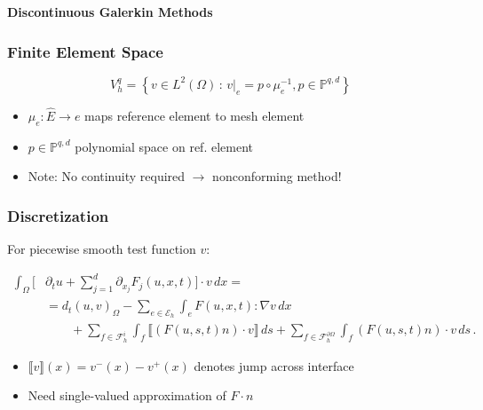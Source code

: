 \documentclass[ignorenonframetext,11pt]{beamer}
\theoremstyle{definition}
\begin{document}

\begin{frame}
\begin{center}
\Large\textbf{Discontinuous Galerkin Methods}
\end{center}
\end{frame}

\begin{frame}
\frametitle{Finite Element Space}

\begin{equation*}
V_h^q = \left\{ v\in L^2(\Omega) \,:\,
v|_e = p\circ\mu_e^{-1}, p\in\mathbb{P}^{q,d}\right\}
\end{equation*}

\begin{itemize}
  \item $\mu_e : \hat{E} \to e$ maps reference element to mesh element
  \item $p\in\mathbb{P}^{q,d}$ polynomial space on ref. element
  \item Note: No continuity required $\rightarrow$ nonconforming method!
\end{itemize}
\end{frame}

\begin{frame}
\frametitle{Discretization}
For piecewise smooth test function $v$:

\begin{equation*}\label{eq:DG_identity}
\begin{split}
\int_\Omega \biggl[&\partial_t u + \sum_{j=1}^{d}\partial_{x_j}F_j(u,x,t)\biggr]\cdot v \,dx = \\
&= d_t (u,v)_\Omega - \sum_{e\in\mathcal{E}_h} \int_e F(u,x,t) : \nabla v\,dx\\
&\qquad + \sum_{f\in\mathcal{F}_h^i} \int_f \llbracket (F(u,s,t)n)\cdot v \rrbracket \,ds
+ \sum_{f\in\mathcal{F}_h^{\partial\Omega}} \int_f (F(u,s,t)n)\cdot v \,ds \,.
\end{split}
\end{equation*}

\begin{itemize}
  \item $\llbracket v \rrbracket (x) = v^-(x)-v^+(x)$ denotes jump across interface
  \item Need single-valued approximation of $F \cdot n$
\end{itemize}
\end{frame}
\end{document}
